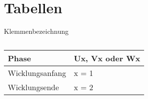 \section{Tabellen}
\begin{table}                                   %
    \centering
    \caption{Klemmenbezeichnung}
    \begin{tabular}{|l|l|} \hline
        \textbf{Phase}                         & \textbf{Ux, Vx oder Wx}               \\ \hline
        Wicklungsanfang                        & x = 1                                 \\ \hline
        Wicklungsende                          & x = 2                                 \\ \hline                              
    \end{tabular}
    \caption*{\cite{SBCs}}
\end{table}

